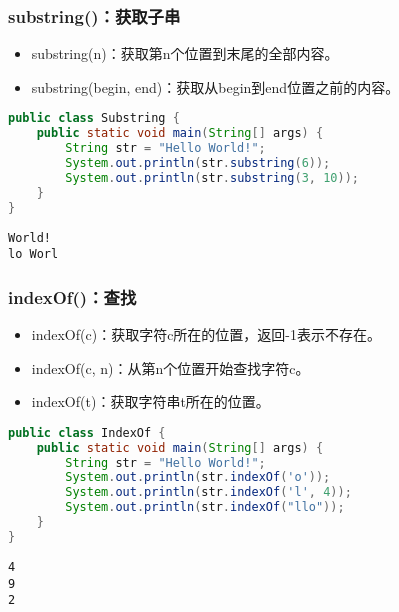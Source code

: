 \subsubsection{substring()：获取子串}

\begin{itemize}
	\item substring(n)：获取第n个位置到末尾的全部内容。
	\item substring(begin, end)：获取从begin到end位置之前的内容。
\end{itemize}


\begin{lstlisting}[language=Java]
public class Substring {
	public static void main(String[] args) {
		String str = "Hello World!";
		System.out.println(str.substring(6));
		System.out.println(str.substring(3, 10));
	}
}
\end{lstlisting}

\begin{tcolorbox}
	\begin{verbatim}
World!
lo Worl
	\end{verbatim}
\end{tcolorbox}

\subsubsection{indexOf()：查找}

\begin{itemize}
	\item indexOf(c)：获取字符c所在的位置，返回-1表示不存在。
	\item indexOf(c, n)：从第n个位置开始查找字符c。
	\item indexOf(t)：获取字符串t所在的位置。
\end{itemize}


\begin{lstlisting}[language=Java]
public class IndexOf {
	public static void main(String[] args) {
		String str = "Hello World!";
		System.out.println(str.indexOf('o'));
		System.out.println(str.indexOf('l', 4));
		System.out.println(str.indexOf("llo"));
	}
}
\end{lstlisting}

\begin{tcolorbox}
	\begin{verbatim}
4
9
2
	\end{verbatim}
\end{tcolorbox}

